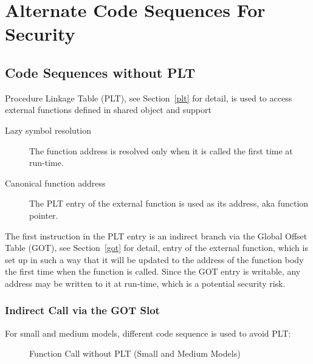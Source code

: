 \chapter{Alternate Code Sequences For Security}

\section{Code Sequences without PLT}

Procedure Linkage Table (PLT), see Section~\ref{plt} for detail, is
used to access external functions defined in shared object and support

\begin{description}
  \item[Lazy symbol resolution] The function address is resolved only
    when it is called the first time at run-time.
  \item[Canonical function address] The PLT entry of the external
    function is used as its address, aka function pointer.
\end{description}

The first instruction in the PLT entry is an indirect branch via the
Global Offset Table (GOT), see Section~\ref{got} for detail, entry of
the external function, which is set up in such a way that it will be
updated to the address of the function body the first time when the
function is called.  Since the GOT entry is writable, any address may
be written to it at run-time, which is a potential security risk.

\subsection{Indirect Call via the GOT Slot}

For small and medium models, different code sequence is used to avoid
PLT:

\begin{figure}[H]
\Hrule
\caption{Function Call without PLT (Small and Medium Models)}
\begin{center}
\small{}
\end{center}
\Hrule
\end{figure}

